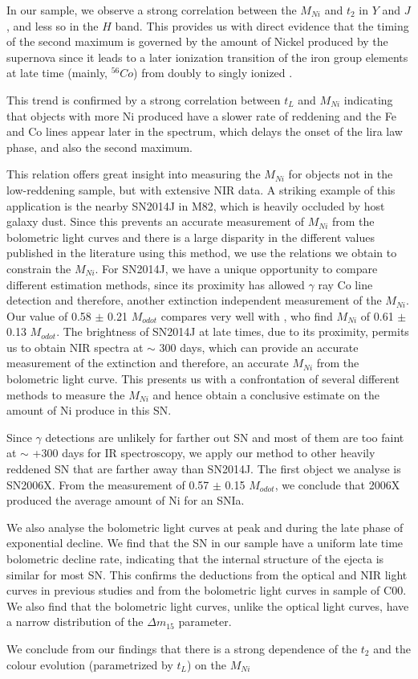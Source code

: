 In our sample, we observe a strong correlation between the $M_{Ni}$ and $t_2$ in $Y$ and $J$, and less so in the $H$ band. 
This provides us with direct evidence that the timing of the second maximum is governed by the amount of Nickel produced by the supernova
since it leads to a later ionization transition of the iron group elements at late time (mainly, $^{56}Co$) from doubly to singly ionized \citep{Kasen2006}.

This trend is confirmed by a strong correlation between  $t_L$  and $M_{Ni}$ indicating that objects with more Ni produced have a slower
rate of reddening and the Fe and Co lines appear later in the spectrum, which delays the onset of the lira law phase, and also the second maximum.

This relation offers great insight into measuring the $M_{Ni}$ for objects not in the low-reddening sample, but with extensive NIR data. 
A striking example of this application is the nearby SN2014J in M82, which is heavily occluded by host galaxy dust. Since this prevents 
an accurate measurement of $M_{Ni}$ from the bolometric light curves and there is a large disparity in the different values published in the literature
using this method, we use the relations we obtain to constrain the $M_{Ni}$. For SN2014J, we have a unique opportunity to compare different estimation methods, 
since its proximity has allowed $\gamma$ ray Co line detection and therefore, another extinction independent measurement of the $M_{Ni}$. Our value of 0.58 $\pm$ 0.21 $M_{odot}$
compares very well with \citet{Churazov2014}, who find $M_{Ni}$ of 0.61 $\pm$ 0.13 $M_{odot}$. The brightness of SN2014J at late times, due to its proximity, permits us to obtain
NIR spectra at $\sim$ 300 days, which can provide an accurate measurement of the extinction and therefore, an accurate $M_{Ni}$ from the bolometric light curve. This presents
us with a confrontation of several different methods to measure the $M_{Ni}$ and hence obtain a conclusive estimate on the amount of Ni produce in this SN.

Since $\gamma$ detections are unlikely for farther out SN and most of them are too faint at $\sim$ +300 days for IR spectroscopy, we apply our method to other heavily reddened SN
that are farther away than SN2014J. The first object we analyse is SN2006X. From the measurement of 0.57 $\pm$ 0.15 $M_{odot}$, we conclude that
2006X produced the average amount of Ni for an SNIa.

We also analyse the bolometric light curves at peak and during the late phase of exponential decline. We find that the SN in our sample have a uniform 
late time bolometric decline rate, indicating that the internal structure of the ejecta is similar for most SN. This confirms the deductions from the optical and NIR 
light curves in previous studies and from the bolometric light curves in sample of C00. We also find that the bolometric light curves, unlike the optical light curves,
have a narrow distribution of the $\Delta m_{15}$ parameter.  

We conclude from our findings that there is a strong dependence of the $t_2$ and the colour evolution (parametrized by $t_L$) on the $M_{Ni}$
